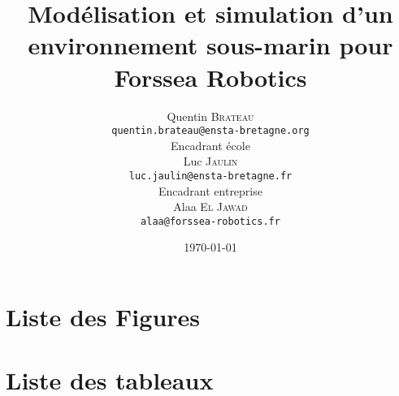 \documentclass{rapport}
\title{Modélisation et simulation d'un environnement sous-marin pour Forssea Robotics}
\author{Quentin \textsc{Brateau} \\ \texttt{quentin.brateau@ensta-bretagne.org} \\[10mm]{\small Encadrant école \\Luc \textsc{Jaulin} \\\texttt{luc.jaulin@ensta-bretagne.fr}} \\[5mm]{\small Encadrant entreprise \\Alaa \textsc{El Jawad} \\\texttt{alaa@forssea-robotics.fr}}}
\date{\today}
\begin{document}
	\frontmatter
	
	\maketitle

	

	\clearpage

	\tableofcontents

	\clearpage

	\mainmatter

	

	
	
	

	

	

	

	
	
	\appendix
	\cleardoublepage
	

	\clearpage
	\chapter{Liste des Figures}
	\makeatletter
	\makeatother


	\clearpage
	\chapter{Liste des tableaux}
	\makeatletter
	\makeatother

	\clearpage
	\label{sec:index}
	\printindex

	\printglossaries


	\clearpage

	
	
\end{document}
